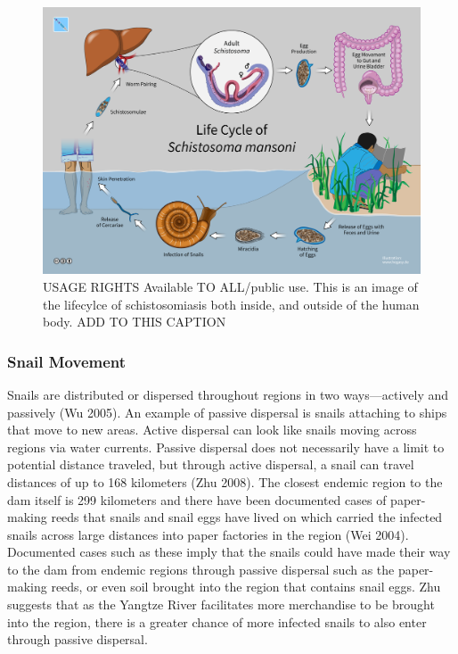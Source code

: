 \documentclass{book}\usepackage{knitr}
\begin{document}
\begin{figure}
\includegraphics[width=\textwidth]{images/schis-life.png}
\caption{USAGE RIGHTS Available TO ALL/public use. This is an image of the lifecylce of schistosomiasis both inside, and outside of the human body. ADD TO THIS CAPTION}
\label{fig:help}
\end{figure}

\subsubsection{Snail Movement}

  Snails are distributed or dispersed throughout regions in two ways—actively and passively (Wu 2005). An example of passive dispersal is snails attaching to ships that move to new areas. Active dispersal can look like snails moving across regions via water currents. Passive dispersal does not necessarily have a limit to potential distance traveled, but through active dispersal, a snail can travel distances of up to 168 kilometers (Zhu 2008). The closest endemic region to the dam itself is 299 kilometers and there have been documented cases of paper-making reeds that snails and snail eggs have lived on which carried the infected snails across large distances into paper factories in the region (Wei 2004). Documented cases such as these imply that the snails could have made their way to the dam from endemic regions through passive dispersal such as the paper-making reeds, or even soil brought into the region that contains snail eggs. Zhu suggests that as the Yangtze River facilitates more merchandise to be brought into the region, there is a greater chance of more infected snails to also enter through passive dispersal. 
\end{document}
